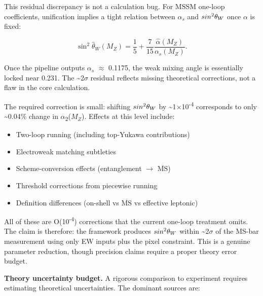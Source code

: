 \documentclass[11pt,a4paper]{article}
\theoremstyle{remark}
\providecommand{\tightlist}{%
  \setlength{\itemsep}{0pt}\setlength{\parskip}{0pt}}
\begin{document}
This residual discrepancy is not a calculation bug. For MSSM one-loop coefficients,
unification implies a tight relation between \(\ensuremath{\alpha}_s\) and \(sin\textsuperscript{2}\ensuremath{\theta}_W\) once \ensuremath{\alpha} is fixed:

\[
\sin^2\hat{\theta}_W(M_Z) = \frac{1}{5} + \frac{7}{15}\frac{\hat{\alpha}(M_Z)}{\alpha_s(M_Z)}.
\]

Once the pipeline outputs \(\ensuremath{\alpha}_s\) \ensuremath{\approx} 0.1175, the weak mixing angle is essentially
locked near 0.231. The \textasciitilde2\ensuremath{\sigma} residual reflects missing theoretical corrections,
not a flaw in the core calculation.

The required correction is small: shifting \(sin\textsuperscript{2}\ensuremath{\theta}_W\) by \textasciitilde1\ensuremath{\times}10\textsuperscript{-4} corresponds to
only \textasciitilde0.04\% change in \ensuremath{\alpha}\textsubscript{2}(\(M_Z\)). Effects at this level include:

\begin{itemize}
\tightlist
\item
  Two-loop running (including top-Yukawa contributions)
\item
  Electroweak matching subtleties
\item
  Scheme-conversion effects (entanglement \ensuremath{\to} \(\overline{\text{MS}}\))
\item
  Threshold corrections from piecewise running
\item
  Definition differences (on-shell vs \(\overline{\text{MS}}\) vs effective leptonic)
\end{itemize}

All of these are O(10\textsuperscript{-4}) corrections that the current one-loop treatment
omits. The claim is therefore: the framework produces \(sin\textsuperscript{2}\ensuremath{\theta}_W\) within \textasciitilde2\ensuremath{\sigma}
of the MS-bar measurement using only EW inputs plus the pixel constraint.
This is a genuine parameter reduction, though precision claims require a
proper theory error budget.

\textbf{Theory uncertainty budget.} A rigorous comparison to experiment requires
estimating theoretical uncertainties. The dominant sources are:
\end{document}
